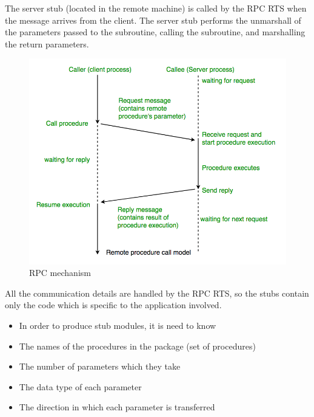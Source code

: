 \documentclass[a4paper, 12pt]{article} %
\begin{document}
                The server stub (located in the remote machine) is called by the RPC RTS when the message arrives from the client. The server stub performs the unmarshall of the parameters passed to the subroutine, calling the subroutine, and marshalling the return parameters. 
                \begin{figure}[h]
                    \centering
                    \includegraphics[width=1.0\textwidth]{rpc-mecha.png}
                    \caption{RPC mechanism}
                    \label{fig:rpc_mechanism}
                \end{figure}
                All the communication details are handled by the RPC RTS, so the stubs contain only the code which is specific to the application involved\cite{rpc2}.
                \begin{itemize}
                    \item In order to produce stub modules, it is need to know
                    \item The names of the procedures in the package (set of procedures)
                    \item The number of parameters which they take
                    \item The data type of each parameter
                    \item The direction in which each parameter is transferred
                \end{itemize}
\end{document}
